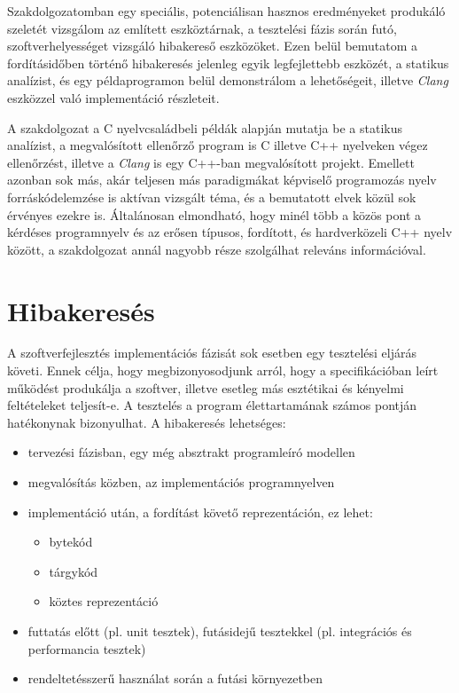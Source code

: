 \documentclass[a4paper,12pt]{report}
\begin{document}
Szakdolgozatomban egy speciális, potenciálisan hasznos eredményeket produkáló szeletét vizsgálom az említett eszköztárnak, a tesztelési fázis során futó, szoftverhelyességet vizsgáló hibakereső eszközöket. Ezen belül bemutatom a fordításidőben történő hibakeresés jelenleg egyik legfejlettebb eszközét, a statikus analízist, és egy példaprogramon belül demonstrálom a lehetőségeit, illetve \emph{Clang} eszközzel való implementáció részleteit.

A szakdolgozat a C nyelvcsaládbeli példák alapján mutatja be a statikus analízist, a megvalósított ellenőrző program is C illetve C++ nyelveken végez ellenőrzést, illetve a \emph{Clang} is egy C++-ban megvalósított projekt. Emellett azonban sok más, akár teljesen más paradigmákat képviselő programozás nyelv forráskódelemzése is aktívan vizsgált téma, és a bemutatott elvek közül sok érvényes ezekre is. Általánosan elmondható, hogy minél több a közös pont a kérdéses programnyelv és az erősen típusos, fordított, és hardverközeli C++ nyelv között, a szakdolgozat annál nagyobb része szolgálhat releváns információval.

\section{Hibakeresés}
A szoftverfejlesztés implementációs fázisát sok esetben egy tesztelési eljárás követi. Ennek célja, hogy megbizonyosodjunk arról, hogy a specifikációban leírt működést produkálja a szoftver, illetve esetleg más esztétikai és kényelmi feltételeket teljesít-e.
A tesztelés a program élettartamának számos pontján hatékonynak bizonyulhat. A hibakeresés lehetséges:
\begin{itemize}
\item tervezési fázisban, egy még absztrakt programleíró modellen
\item megvalósítás közben, az implementációs programnyelven
\item implementáció után, a fordítást követő reprezentáción, ez lehet:
\begin{itemize}
\item bytekód
\item tárgykód
\item köztes reprezentáció
\end{itemize}
\item futtatás előtt (pl. unit tesztek), futásidejű tesztekkel (pl. integrációs és performancia tesztek)
\item rendeltetésszerű használat során a futási környezetben \cite{chaosmonkey}
\end{itemize}
\end{document}
